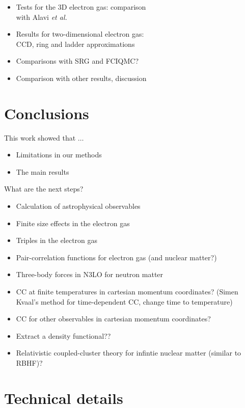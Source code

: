 \documentclass[a4paper,12pt]{report}
\begin{document}
\begin{itemize}
\item Tests for the 3D electron gas: comparison \\
  with Alavi \emph{et al.}
\item Results for two-dimensional electron gas: \\
  CCD, ring and ladder approximations
\item Comparisons with SRG and FCIQMC?
\item Comparison with other results, discussion
\end{itemize}




\chapter{Conclusions}
This work showed that $\dots $
\begin{itemize}
\item Limitations in our methods
\item The main results
\end{itemize}
What are the next steps?
\begin{itemize}
\item Calculation of astrophysical observables
\item Finite size effects in the electron gas
\item Triples in the electron gas 
\item Pair-correlation functions for electron gas
  (and nuclear matter?)
\item Three-body forces in N3LO for neutron matter 
\item CC at finite temperatures in cartesian momentum 
  coordinates? (Simen Kvaal's method for time-dependent
  CC, change time to temperature)
\item CC for other observables in cartesian momentum
  coordinates?
\item Extract a density functional??
\item Relativistic coupled-cluster theory for infintie 
  nuclear matter (similar to RBHF)?
\end{itemize}





\appendix

\chapter{Technical details} \label{sec:app_ang_mom}
\end{document}
